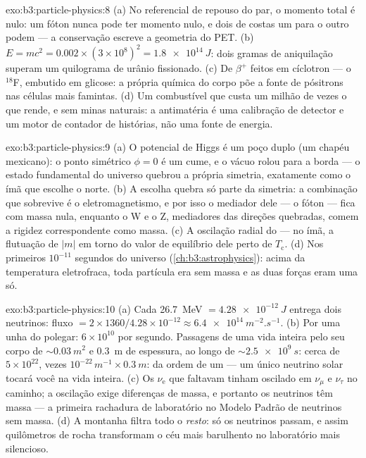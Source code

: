 \begin{solution}{exo:b3:particle-physics:8}
(a) No referencial de repouso do par, o momento total é nulo: um
fóton nunca pode ter momento nulo, e dois de costas um para o outro podem
--- a conservação escreve a geometria do PET. (b) $E = mc^2 =
0.002\times(3\times10^8)^2 = \qty{1.8e14}{J}$: dois gramas de
aniquilação superam um quilograma de urânio fissionado. (c) De
 $\beta^+$ feitos em cíclotron --- o $^{18}$F, embutido em
glicose: a própria química do corpo põe a fonte de pósitrons nas
células mais famintas. (d) Um combustível que custa um milhão de vezes o
que rende, e sem minas naturais: a antimatéria é uma calibração de
detector e um motor de contador de histórias, não uma fonte de energia.
\end{solution}

\begin{solution}{exo:b3:particle-physics:9}
(a) O potencial de Higgs é um poço duplo (um chapéu mexicano): o
ponto simétrico $\phi = 0$ é um cume, e o vácuo rolou
para a borda --- o estado fundamental do universo quebrou a própria
simetria, exatamente como o ímã que escolhe o norte. (b) A escolha
quebra só parte da simetria: a combinação que sobrevive
é o eletromagnetismo, e por isso o mediador dele --- o fóton --- fica com
massa nula, enquanto o W e o Z, mediadores das direções quebradas,
comem a rigidez correspondente como massa. (c) A oscilação radial
do  --- no ímã, a
flutuação de $|m|$ em torno do valor de equilíbrio dele perto de
$T_{\text{c}}$. (d) Nos primeiros $10^{-11}$ segundos do
universo (\cref{ch:b3:astrophysics}): acima da temperatura
eletrofraca, toda partícula era sem massa e as duas forças eram
uma só.
\end{solution}

\begin{solution}{exo:b3:particle-physics:10}
(a) Cada \qty{26.7}{MeV} $= \qty{4.28e-12}{J}$ entrega dois
neutrinos: fluxo $= 2\times1360/4.28\times10^{-12} \approx
\qty{6.4e14}{m^{-2}.s^{-1}}$. (b) Por uma unha do polegar:
$6\times10^{10}$ por segundo. Passagens de uma vida inteira pelo seu
corpo de ${\sim}\qty{0.03}{m^2}$ e \qty{0.3}{m} de espessura, ao longo de
${\sim}\qty{2.5e9}{s}$: cerca de $5\times10^{22}$, vezes
$10^{-22}\,\unit{m^{-1}}\times\qty{0.3}{m}$: da ordem de um ---
um único neutrino solar tocará você na vida inteira. (c)
Os $\nu_{\text{e}}$ que faltavam tinham oscilado em $\nu_\mu$ e
$\nu_\tau$ no caminho; a oscilação exige diferenças de massa, e portanto
os neutrinos têm massa --- a primeira rachadura de laboratório no
Modelo Padrão de neutrinos sem massa. (d) A montanha filtra
todo o \emph{resto}: só os neutrinos passam, e assim quilômetros de
rocha transformam o céu mais barulhento no laboratório mais silencioso.
\end{solution}

